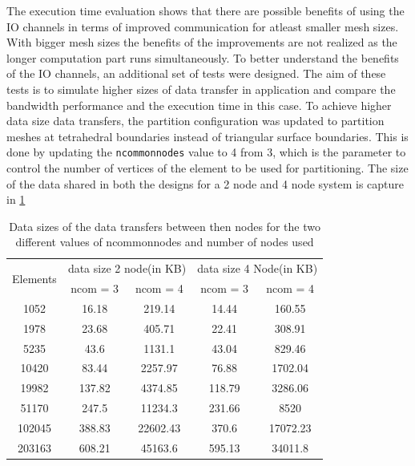 The execution time evaluation shows that there are possible benefits of using the IO channels
in terms of improved communication for atleast smaller mesh sizes. With bigger mesh sizes
the benefits of the improvements are not realized as the longer computation part runs
simultaneously. To better understand the benefits of the IO channels, an additional set of
tests were designed. The aim of these tests is to simulate higher sizes of data transfer
in application and compare the bandwidth performance and the execution time in this case.
To achieve higher data size data transfers, the partition configuration was updated to
partition meshes at tetrahedral boundaries instead of triangular surface boundaries.
This is done by updating the \texttt{ncommonnodes} value to 4 from 3, which is the parameter
to control the number of vertices of the element to be used for partitioning. The
size of the data shared in both the designs for a 2 node and 4 node system is
capture in \ref{tab:sizes_var}
\begin{table}[ht]
    \centering
    \caption{Data sizes of the data transfers between then nodes for the two different values of ncommonnodes and number of nodes used}
    \label{tab:sizes_var}
    \begin{tabular}{|ccccc|}
    \hline
    \multirow{2}{*}{Elements} & \multicolumn{2}{c|}{data size 2 node(in KB)} & \multicolumn{2}{c|}{data size 4 Node(in KB)} \\ \cline{2-5}
     & ncom = 3 & ncom = 4 & ncom = 3 & ncom = 4 \\ \hline
    1052 & 16.18 & 219.14 & 14.44 & 160.55 \\ \hline
    1978 & 23.68 & 405.71 & 22.41 & 308.91 \\ \hline
    5235 & 43.6 & 1131.1 & 43.04 & 829.46 \\ \hline
    10420 & 83.44 & 2257.97 & 76.88 & 1702.04 \\ \hline
    19982 & 137.82 & 4374.85 & 118.79 & 3286.06 \\ \hline
    51170 & 247.5 & 11234.3 & 231.66 & 8520 \\ \hline
    102045 & 388.83 & 22602.43 & 370.6 & 17072.23 \\ \hline
    203163 & 608.21 & 45163.6 & 595.13 & 34011.8 \\ \hline
    \end{tabular}%
\end{table}

